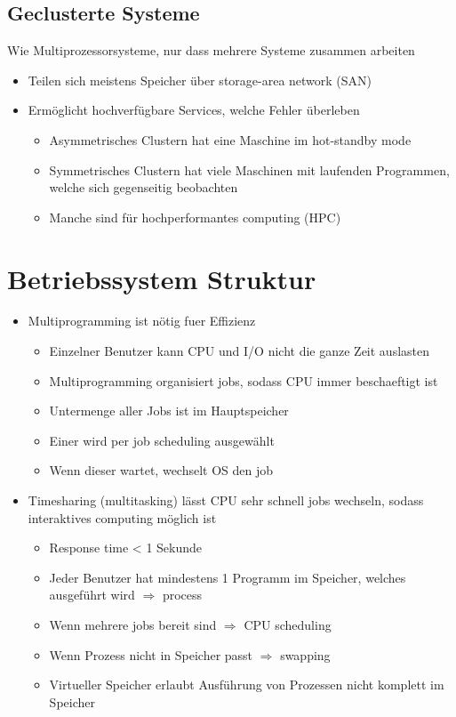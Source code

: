\documentclass[a4paper]{scrreprt}
\begin{document}
\subsection{Geclusterte Systeme}
Wie Multiprozessorsysteme, nur dass mehrere Systeme zusammen arbeiten

\begin{itemize}
	\item Teilen sich meistens Speicher über storage-area network (SAN)
	\item Ermöglicht hochverfügbare Services, welche Fehler überleben
		\begin{itemize}
			\item Asymmetrisches Clustern hat eine Maschine im hot-standby mode
			\item Symmetrisches Clustern hat viele Maschinen mit laufenden Programmen, welche sich gegenseitig beobachten
			\item Manche sind für hochperformantes computing (HPC)
		\end{itemize}
\end{itemize}

\section{Betriebssystem Struktur}
\begin{itemize}
	\item Multiprogramming ist nötig fuer Effizienz
		\begin{itemize}
			\item Einzelner Benutzer kann CPU und I/O nicht die ganze Zeit auslasten
			\item Multiprogramming organisiert jobs, sodass CPU immer beschaeftigt ist
			\item Untermenge aller Jobs ist im Hauptspeicher
			\item Einer wird per job scheduling ausgewählt
			\item Wenn dieser wartet, wechselt OS den job
		\end{itemize}
	\item Timesharing (multitasking) lässt CPU sehr schnell jobs wechseln, sodass interaktives computing möglich ist
		\begin{itemize}
			\item Response time < 1 Sekunde
			\item Jeder Benutzer hat mindestens 1 Programm im Speicher, welches ausgeführt wird $\Rightarrow$ process
			\item Wenn mehrere jobs bereit sind $\Rightarrow$ CPU scheduling
			\item Wenn Prozess nicht in Speicher passt $\Rightarrow$ swapping
			\item Virtueller Speicher erlaubt Ausführung von Prozessen nicht komplett im Speicher
		\end{itemize}
\end{itemize}
\end{document}
